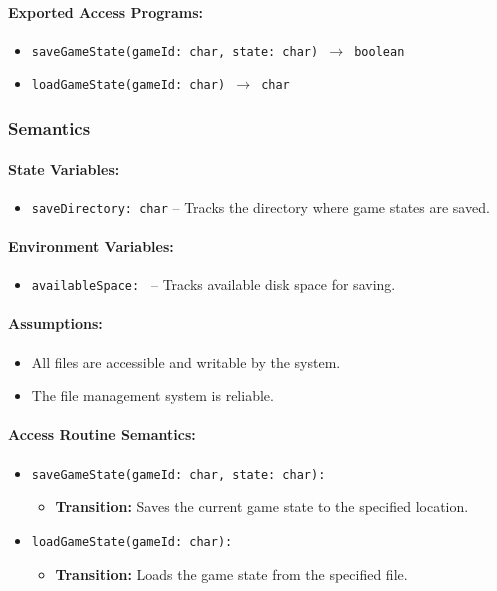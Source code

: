 \documentclass[12pt, titlepage]{article}
\begin{document}
\paragraph{Exported Access Programs:}
\begin{itemize}
    \item \texttt{saveGameState(gameId: char, state: char) $\to$ boolean}
    \item \texttt{loadGameState(gameId: char) $\to$ char}
\end{itemize}

\subsubsection{Semantics}

\paragraph{State Variables:}
\begin{itemize}
    \item \texttt{saveDirectory: char} -- Tracks the directory where game states are saved.
\end{itemize}

\paragraph{Environment Variables:}
\begin{itemize}
    \item \texttt{availableSpace: } -- Tracks available disk space for saving.
\end{itemize}

\paragraph{Assumptions:}
\begin{itemize}
    \item All files are accessible and writable by the system.
    \item The file management system is reliable.
\end{itemize}

\paragraph{Access Routine Semantics:}
\begin{itemize}
    \item \texttt{saveGameState(gameId: char, state: char):}
    \begin{itemize}
        \item \textbf{Transition:} Saves the current game state to the specified location.
    \end{itemize}
    \item \texttt{loadGameState(gameId: char):}
    \begin{itemize}
        \item \textbf{Transition:} Loads the game state from the specified file.
    \end{itemize}
\end{itemize}
\end{document}
